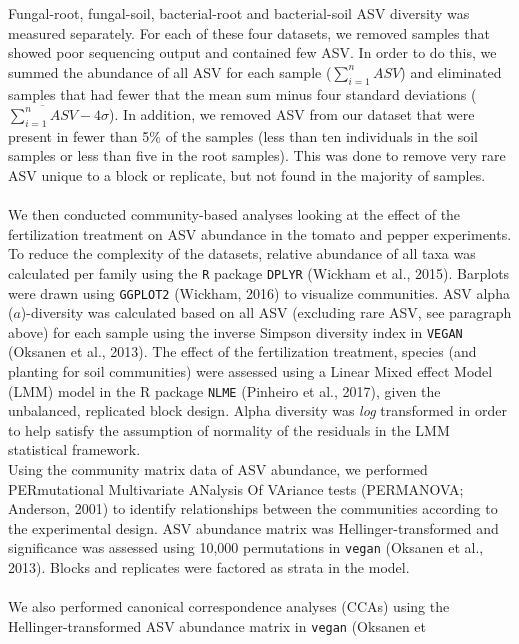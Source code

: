 \documentclass[12pt,]{article}
\begin{document}
Fungal-root, fungal-soil, bacterial-root and bacterial-soil ASV
diversity was measured separately. For each of these four datasets, we
removed samples that showed poor sequencing output and contained few
ASV. In order to do this, we summed the abundance of all ASV for each
sample (\(\sum_{i=1}^n ASV\)) and eliminated samples that had fewer that
the mean sum minus four standard deviations
(\(\overline{\sum_{i=1}^n ASV} - 4\sigma\)). In addition, we removed ASV
from our dataset that were present in fewer than 5\% of the samples
(less than ten individuals in the soil samples or less than five in the
root samples). This was done to remove very rare ASV unique to a block
or replicate, but not found in the majority of samples.\\
\hspace*{0.333em}\\
We then conducted community-based analyses looking at the effect of the
fertilization treatment on ASV abundance in the tomato and pepper
experiments. To reduce the complexity of the datasets, relative
abundance of all taxa was calculated per family using the \texttt{R}
package \texttt{DPLYR} (Wickham et al., 2015). Barplots were drawn using
\texttt{GGPLOT2} (Wickham, 2016) to visualize communities. ASV alpha
(\(a\))-diversity was calculated based on all ASV (excluding rare ASV,
see paragraph above) for each sample using the inverse Simpson diversity
index in \texttt{VEGAN} (Oksanen et al., 2013). The effect of the
fertilization treatment, species (and planting for soil communities)
were assessed using a Linear Mixed effect Model (LMM) model in the R
package \texttt{NLME} (Pinheiro et al., 2017), given the unbalanced,
replicated block design. Alpha diversity was \emph{log} transformed in
order to help satisfy the assumption of normality of the residuals in
the LMM statistical framework. ~\\
Using the community matrix data of ASV abundance, we performed
PERmutational Multivariate ANalysis Of VAriance tests (PERMANOVA;
Anderson, 2001) to identify relationships between the communities
according to the experimental design. ASV abundance matrix was
Hellinger-transformed and significance was assessed using 10,000
permutations in \texttt{vegan} (Oksanen et al., 2013). Blocks and
replicates were factored as strata in the model.\\
\hspace*{0.333em}\\
We also performed canonical correspondence analyses (CCAs) using the
Hellinger-transformed ASV abundance matrix in \texttt{vegan} (Oksanen et
\end{document}
